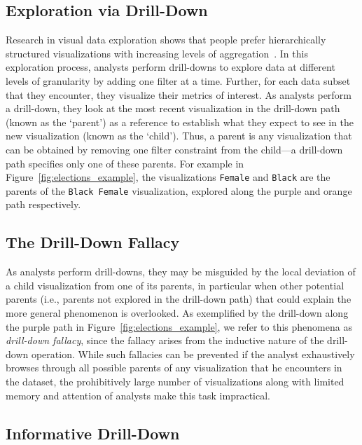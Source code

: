 \subsection{Exploration via Drill-Down}
Research in visual data exploration shows that people prefer hierarchically structured visualizations with increasing levels of aggregation~\cite{Kim2017,Hullman2017,Hullman2013}. In this exploration process, analysts perform drill-downs to explore data at different levels of granularity by adding one filter at a time. Further, for each data subset that they encounter, they visualize their metrics of interest. As analysts perform a drill-down, they look at the most recent visualization in the drill-down path (known as the `parent') as a reference to establish what they expect to see in the new visualization (known as the `child'). Thus, a parent is any visualization that can be obtained by removing one filter constraint from the child---a drill-down path specifies only one of these parents. For example in Figure~\ref{fig:elections_example}, the visualizations \texttt{Female} and \texttt{Black} are the parents of the \texttt{Black Female} visualization, explored along the purple and orange path respectively. 

\subsection{The Drill-Down Fallacy}
As analysts perform drill-downs, they may be misguided by the local deviation of a child visualization from one of its parents, in particular when other potential parents (i.e., parents not explored in the drill-down path) that could explain the more general phenomenon is overlooked. As exemplified by the drill-down along the purple path in Figure~\ref{fig:elections_example}, we refer to this phenomena as \emph{drill-down fallacy}, since the fallacy arises from the inductive nature of the drill-down operation. While such fallacies can be prevented if the analyst exhaustively browses through all possible parents of any visualization that he encounters in the dataset, the prohibitively large number of visualizations along with limited memory and attention of analysts make this task impractical.

\subsection{Informative Drill-Down}

